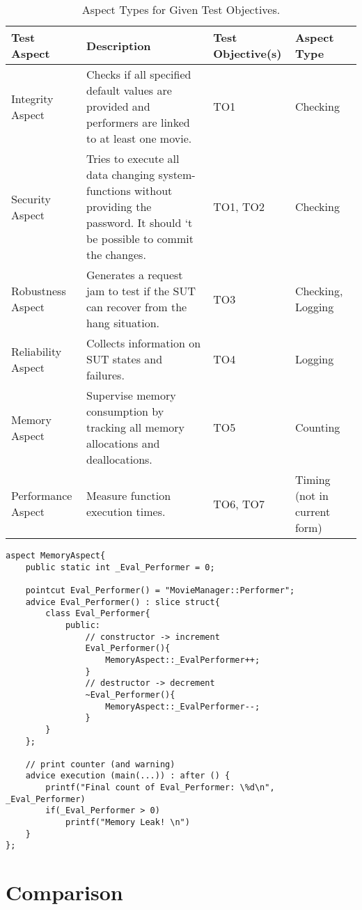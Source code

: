 \begin{table}[h]
\begin{small}
\caption{Aspect Types for Given Test Objectives.}
\begin{tabular}{>{\raggedright}p{1.7cm}|p{8cm}|p{1.1cm}|p{2.2cm}}
\hline
\textbf{Test \quad Aspect} & \textbf{Description} & \textbf{Test Objective(s)} & \textbf{Aspect Type}\\
\hline
Integrity Aspect & Checks if all specified default values are provided and performers are linked to at least one movie. & TO1 & Checking \\
\hline
Security Aspect & Tries to execute all data changing system-functions without providing the password. It should ‘t be possible to commit the changes. & TO1, TO2 & Checking\\
\hline
Robustness Aspect & Generates a request jam to test if the SUT can recover from the hang situation. & TO3 & Checking, Logging\\
\hline
Reliability Aspect & Collects information on SUT states and failures. & TO4 & Logging\\
\hline
Memory Aspect & Supervise memory consumption by tracking all memory allocations and deallocations. & TO5 & Counting\\
\hline
Performance Aspect & Measure function execution times. & TO6, TO7 & Timing (not in current form)\\
\hline
\end{tabular}
\label{aspect-test}
\end{small}
\end{table}

\lstset {language=C++}
\begin{lstlisting}[caption={Generated Counter Aspect Code.}, label=mem]
aspect MemoryAspect{
	public static int _Eval_Performer = 0;
	
	pointcut Eval_Performer() = "MovieManager::Performer";
	advice Eval_Performer() : slice struct{
		class Eval_Performer{
			public:
				// constructor -> increment
				Eval_Performer(){
					MemoryAspect::_EvalPerformer++;
				}
				// destructor -> decrement
				~Eval_Performer(){
					MemoryAspect::_EvalPerformer--;
				} 
		} 
	};

	// print counter (and warning)
	advice execution (main(...)) : after () {
		printf("Final count of Eval_Performer: \%d\n",  _Eval_Performer)
		if(_Eval_Performer > 0)
			printf("Memory Leak! \n")
	}
};
\end{lstlisting}


\section{Comparison} \label{compare}

